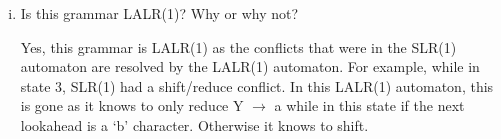 \documentclass{article}
\begin{document}
\begin{enumerate}[i.]
	\item Is this grammar LALR(1)? Why or why not?

		Yes, this grammar is LALR(1) as the conflicts that were in the
		SLR(1) automaton are resolved by the LALR(1) automaton. For
		example, while in state 3, SLR(1) had a shift/reduce conflict.
		In this LALR(1) automaton, this is gone as it knows to only
		reduce Y $\to$ a while in this state if the next lookahead is a
		`b' character. Otherwise it knows to shift.
\end{enumerate}
\end{document}
